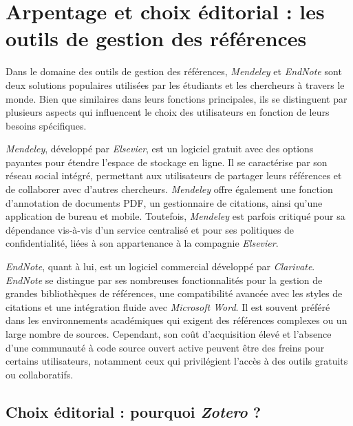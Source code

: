 \documentclass[
  letterpaper,
  DIV=11,
  numbers=noendperiod,
  oneside]{scrreprt}
\begin{document}
\hypertarget{arpentage-et-choix-uxe9ditorial-les-outils-de-gestion-des-ruxe9fuxe9rences}{%
\section{Arpentage et choix éditorial : les outils de gestion des
références}\label{arpentage-et-choix-uxe9ditorial-les-outils-de-gestion-des-ruxe9fuxe9rences}}

Dans le domaine des outils de gestion des références, \emph{Mendeley} et
\emph{EndNote} sont deux solutions populaires utilisées par les
étudiants et les chercheurs à travers le monde. Bien que similaires dans
leurs fonctions principales, ils se distinguent par plusieurs aspects
qui influencent le choix des utilisateurs en fonction de leurs besoins
spécifiques.

\emph{Mendeley}, développé par \emph{Elsevier}, est un logiciel gratuit
avec des options payantes pour étendre l'espace de stockage en ligne. Il
se caractérise par son réseau social intégré, permettant aux
utilisateurs de partager leurs références et de collaborer avec d'autres
chercheurs. \emph{Mendeley} offre également une fonction d'annotation de
documents PDF, un gestionnaire de citations, ainsi qu'une application de
bureau et mobile. Toutefois, \emph{Mendeley} est parfois critiqué pour
sa dépendance vis-à-vis d'un service centralisé et pour ses politiques
de confidentialité, liées à son appartenance à la compagnie
\emph{Elsevier}.

\emph{EndNote}, quant à lui, est un logiciel commercial développé par
\emph{Clarivate}. \emph{EndNote} se distingue par ses nombreuses
fonctionnalités pour la gestion de grandes bibliothèques de références,
une compatibilité avancée avec les styles de citations et une
intégration fluide avec \emph{Microsoft Word}. Il est souvent préféré
dans les environnements académiques qui exigent des références complexes
ou un large nombre de sources. Cependant, son coût d'acquisition élevé
et l'absence d'une communauté à code source ouvert active peuvent être
des freins pour certains utilisateurs, notamment ceux qui privilégient
l'accès à des outils gratuits ou collaboratifs.

\hypertarget{choix-uxe9ditorial-pourquoi-zotero}{%
\subsection{\texorpdfstring{Choix éditorial : pourquoi \emph{Zotero}
?}{Choix éditorial : pourquoi Zotero ?}}\label{choix-uxe9ditorial-pourquoi-zotero}}
\end{document}
